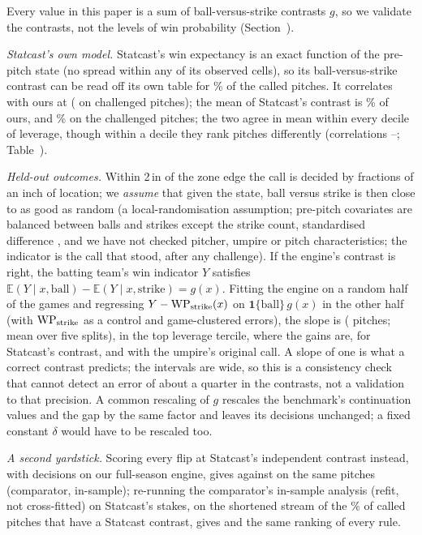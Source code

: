 \documentclass[aoas]{imsart}
\theoremstyle{plain}
\theoremstyle{definition}
\newcommand{\E}{\mathbb{E}}
\begin{document}
Every value in this paper is a sum of ball-versus-strike contrasts $g$, so we validate the contrasts, not the levels
of win probability (Section~).

\emph{Statcast's own model.} Statcast's win expectancy is an exact function of the pre-pitch state (no spread within
any of its observed cells), so its ball-versus-strike contrast can be read off its own table for \SVSharePct\% of the
called pitches. It correlates with ours at \SVCorr{} (\SVCorrCh{} on challenged pitches); the mean of Statcast's
contrast is \SVRatioPct\% of ours, and \SVRatioChPct\% on the challenged pitches; the two agree in mean within every decile of leverage, though within a decile they rank pitches differently
(correlations \SVDecCorrLo--\SVDecCorrHi; Table~).

\emph{Held-out outcomes.} Within 2\,in of the zone edge the call is decided by fractions of an inch of location; we
\emph{assume} that given the state, ball versus strike is then close to as good as random (a local-randomisation assumption; pre-pitch covariates are balanced between balls and strikes except the strike
count, standardised difference \EdgeStrikesSD, and we have not checked pitcher, umpire or pitch characteristics; the
indicator is the call that stood, after any challenge). If the engine's contrast is right, the batting
team's win indicator $Y$ satisfies $\E(Y\mid x,\text{ball})-\E(Y\mid x,\text{strike})=g(x)$. Fitting the engine on a
random half of the games and regressing $Y-\mathrm{WP}_{\rm strike}(x)$ on $\mathbf 1\{\text{ball}\}\,g(x)$ in the
other half (with $\mathrm{WP}_{\rm strike}$ as a control and game-clustered errors), the slope is \SVSlope{}
\SVSlopeCI{} (\SVN{} pitches; mean over five splits), \SVSlopeHigh{} \SVSlopeHighCI{} in the top leverage tercile,
where the gains are, \SVSlopeSC{} for Statcast's contrast, and \EdgeOrigSlope{} \EdgeOrigSlopeCI{} with the umpire's
original call. A slope of one is what a correct contrast predicts; the intervals are wide, so this is a consistency check
that cannot detect an error of about a quarter in the contrasts, not a validation to that precision. A common rescaling of $g$ rescales the benchmark's continuation values and the gap by the same factor and leaves
its decisions unchanged; a fixed constant $\delta$ would have to be rescaled too.

\emph{A second yardstick.} Scoring every flip at Statcast's independent contrast instead, with decisions on our
full-season engine, gives \SVLostOursSC{} against \SVLostOursSame{} on the same pitches (comparator, in-sample); re-running the
comparator's in-sample analysis (refit, not cross-fitted) on Statcast's stakes, on the shortened stream of the \SVSharePct\%
of called pitches that have a Statcast contrast, gives \SVLostSC{} and the same ranking of every rule.
\end{document}

